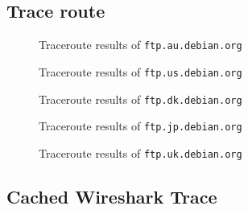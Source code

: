 \documentclass{acm_proc_article-sp}
\begin{document}
\subsection{Trace route}
\label{sec:appendix|sub:traceroute}
\begin{figure}[H]
    
    \caption{Traceroute results of {\tt ftp.au.debian.org}}
    \label{fig:traceroute-au}
\end{figure}

\begin{figure}[H]
    
    \caption{Traceroute results of {\tt ftp.us.debian.org}}
    \label{fig:traceroute-us}
\end{figure}

\begin{figure}[H]
    
    \caption{Traceroute results of {\tt ftp.dk.debian.org}}
    \label{fig:traceroute-dk}
\end{figure}

\begin{figure}[H]
    
    \caption{Traceroute results of {\tt ftp.jp.debian.org}}
    \label{fig:traceroute-jp}
\end{figure}

\begin{figure}[H]
    
    \caption{Traceroute results of {\tt ftp.uk.debian.org}}
    \label{fig:traceroute-uk}
\end{figure}

\subsection{Cached Wireshark Trace}
\label{sec:appendix|sub:trace-cached}
{\ }


\end{document}
